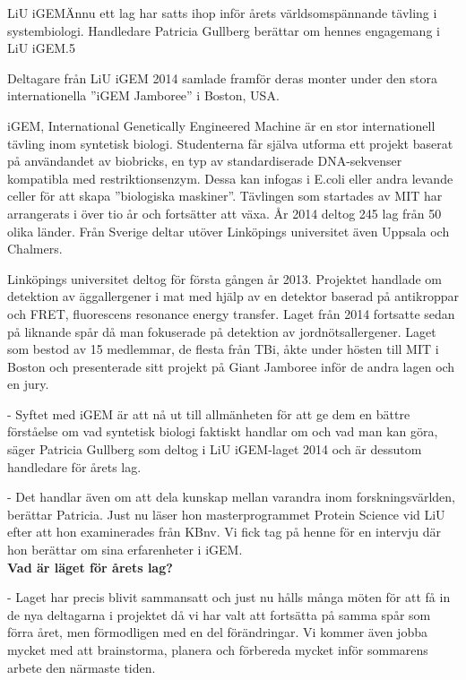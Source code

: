 \begin{news}{3}{LiU iGEM}{Ännu ett lag
  har satts ihop inför årets världsomspännande tävling i
  systembiologi. Handledare Patricia Gullberg berättar om hennes
  engagemang i LiU iGEM.}{}{5}

     {Deltagare från LiU iGEM 2014 samlade
     framför deras monter under den stora internationella ”iGEM
     Jamboree” i Boston, USA.}
     
  iGEM, International Genetically Engineered Machine är en stor
  internationell tävling inom syntetisk biologi. Studenterna får
  själva utforma ett projekt baserat på användandet av biobricks, en
  typ av standardiserade DNA-sekvenser kompatibla med
  restriktionsenzym. Dessa kan infogas i E.coli eller andra levande
  celler för att skapa ”biologiska maskiner”. Tävlingen som startades
  av MIT har arrangerats i över tio år och fortsätter att växa. År
  2014 deltog 245 lag från 50 olika länder. Från Sverige deltar utöver
  Linköpings universitet även Uppsala och Chalmers.

  Linköpings universitet deltog för första gången år 2013. Projektet
  handlade om detektion av äggallergener i mat med hjälp av en
  detektor baserad på antikroppar och FRET, fluorescens resonance
  energy transfer. Laget från 2014 fortsatte sedan på liknande spår då
  man fokuserade på detektion av jordnötsallergener. Laget som bestod
  av 15 medlemmar, de flesta från TBi, åkte under hösten till MIT i Boston
  och presenterade sitt projekt på Giant Jamboree inför de andra lagen och en
  jury.


  - Syftet med iGEM är att nå ut till allmänheten för att ge dem en
  bättre förståelse om vad syntetisk biologi faktiskt handlar om och
  vad man kan göra, säger Patricia Gullberg som deltog i LiU
  iGEM-laget 2014 och är dessutom handledare för årets lag.

  - Det handlar även om att dela kunskap mellan varandra inom
  forskningsvärlden, berättar Patricia. Just nu läser hon
  masterprogrammet Protein Science vid LiU efter att hon examinerades
  från KBnv. Vi fick tag på henne för en intervju där hon berättar om
  sina erfarenheter i iGEM.
\\

 \noindent \textbf{Vad är läget för årets lag?}

  - Laget har precis blivit
  sammansatt och just nu hålls många möten för att få in de nya
  deltagarna i projektet då vi har valt att fortsätta på samma spår
  som förra året, men förmodligen med en del förändringar. Vi kommer
  även jobba mycket med att brainstorma, planera och förbereda mycket
  inför sommarens arbete den närmaste tiden.
\\


\end{news}
